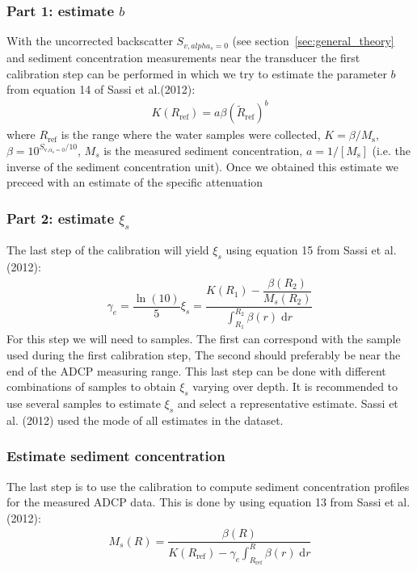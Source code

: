 \documentclass[]{article}
\begin{document}
\subsubsection{Part 1: estimate $b$}
With the uncorrected backscatter $S_{v,alpha_s=0}$ (see section~\ref{sec:general_theory} and sediment concentration measurements near the transducer the first calibration step can be performed in which we try to estimate the parameter $b$ from equation 14 of Sassi et al.(2012):
\begin{align}
  K(R_\text{ref})=a\beta(\tilde{R}_\text{ref})^b
\end{align}
where $R_\text{ref}$ is the range where the water samples were collected, $K=\beta/M_\text{s}$, $\beta=10^{S_{\text{v,}\alpha_\text{s}=0}/10}$, $M_s$ is the measured sediment concentration, $a=1/[M_\text{s}]$ (i.e. the inverse of the sediment concentration unit). 
Once we obtained this estimate we preceed with an estimate of the specific attenuation

\subsubsection{Part 2: estimate $\xi_s$}
The last step of the calibration will yield $\xi_s$ using equation 15 from Sassi et al. (2012):
\begin{align}
  \gamma_e=\dfrac{\ln(10)}{5}\xi_s=\dfrac{K(R_1)-\dfrac{\beta(R_2)}{M_s(R_2)}}{\int_{R_1}^{R_2}\beta(r)\;\text{d}r}
\end{align}
For this step we will need to samples. The first can correspond with the sample used during the first calibration step, The second should preferably be near the end of the ADCP measuring range. This last step can be done with different combinations of samples to obtain $\xi_s$ varying over depth. It is recommended to use several samples to estimate $\xi_s$ and select a representative estimate. Sassi et al. (2012) used the mode of all estimates in the dataset.


\subsubsection{Estimate sediment concentration}
The last step is to use the calibration to compute sediment concentration profiles for the measured ADCP data.
This is done by using equation 13 from Sassi et al. (2012):
\begin{align}
  M_s(R)=\dfrac{\beta(R)}{K(R_\text{ref})-\gamma_e\int_{R_\text{ref}}^R\beta(r)\;\text{d}r}
\end{align}
\end{document}
